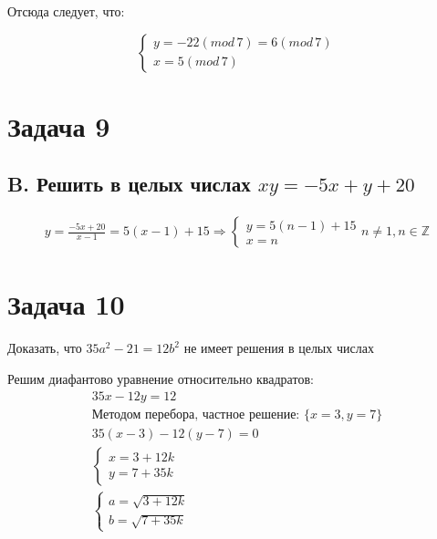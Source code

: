 \documentclass[a4paper,12pt]{article}
\begin{document}
Отсюда следует, что:

$$
\begin{cases}
    y = -22(mod\, 7) = 6(mod\, 7)\\
    x = 5(mod\, 7)
\end{cases}
$$

\section*{Задача 9}
\subsection*{B. Решить в целых числах $xy = -5x+y+20$}
\begin{gather*}
    y = \frac{-5x+20}{x-1} = 5(x-1) + 15 \Rightarrow 
    \begin{cases}
        y = 5(n-1) + 15 \\
        x = n
    \end{cases}
    n \neq 1, n\in \mathbb{Z}
\end{gather*}

\section*{Задача 10}
Доказать, что $35a^2 - 21 = 12b^2$ не имеет решения в целых числах

Решим диафантово уравнение относительно квадратов:
\begin{gather*}
    35x-12y=12\\
    \text{Методом перебора, частное решение: } \{ x=3, y=7 \} \\
    35(x-3) - 12(y-7) = 0 \\
    \begin{cases}
        x = 3 + 12k \\
        y = 7 + 35k
    \end{cases} \\
    \begin{cases}
        a = \sqrt{3+12k}\\
        b = \sqrt{7+35k}
    \end{cases}
\end{gather*}
\end{document}
